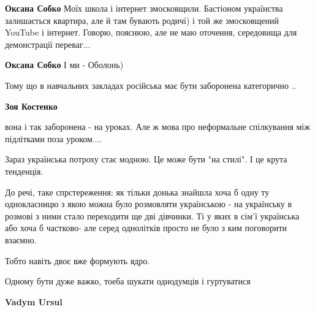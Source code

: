 \begin{itemize}
\begin{itemize}
\textbf{Оксана Собко} Моїх школа і інтернет змосковщили. Бастіоном українства залишається квартира, але й там бувають родичі) і той же змосковщений YouTube і інтернет. Говорю, пояснюю, але не маю оточення, середовища для демонстрації переваг...

 
\textbf{Оксана Собко} І ми - Оболонь)

 
Тому що в навчальних закладах російська має бути заборонена категорично ..

 
\textbf{Зоя Костенко} 

вона і так заборонена - на уроках. Але ж мова про неформальне спілкування між
підлітками поза уроком....

Зараз українська потроху стає модною. Це може бути "на стилі". І це крута
тенденція.

До речі, таке спрстереження: як тільки донька знайшла хоча б одну ту
однокласницю з якою можна було розмовляти українською - на українську в розмові
з ними стало переходити ще дві дівчинки. Ті у яких в сім'ї українська або хоча
б частково- але серед однолітків просто не було з ким поговорити взаємно.

Тобто навіть двоє вже формують ядро.

Одному бути дуже важко, тоеба шукати однодумців і гуртуватися


 
\textbf{Vadym Ursul}


\end{itemize}
\end{itemize}
